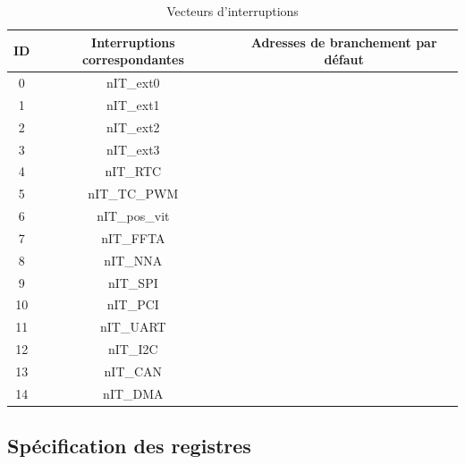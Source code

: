 \begin{table}[H]
	\centering
	\begin{tabular}{|c|c|c|}
		\hline
		ID & Interruptions correspondantes & Adresses de branchement par défaut\\
		\hline
		0 & nIT\_ext0 & \\
		\hline
		1 & nIT\_ext1 & \\
		\hline
		2 & nIT\_ext2 & \\
		\hline
		3 & nIT\_ext3 &\\
		\hline
		4 & nIT\_RTC &\\
		\hline
		5 & nIT\_TC\_PWM &\\
		\hline
		6 & nIT\_pos\_vit &\\
		\hline
		7 & nIT\_FFTA &\\
		\hline
		8 & nIT\_NNA &\\
		\hline
		9 & nIT\_SPI &\\
		\hline
		10 & nIT\_PCI &\\
		\hline
		11 & nIT\_UART &\\
		\hline
		12 & nIT\_I2C &\\
		\hline
		13 & nIT\_CAN &\\
		\hline
		14 & nIT\_DMA &\\
		\hline
	\end{tabular}
	\caption{Vecteurs d'interruptions}
	\label{tab:vec_int}
\end{table}




\subsection{Spécification des registres}
\newpage

